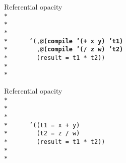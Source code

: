 \begin{frame}{Referential opacity}
  \texttt{
    \ \\*
    \ \\*
    \ \\*
    \ \\*
    \ \ \ \ \ `(,@\textbf{(compile '(+ x y) 't1)}\\*
    \ \ \ \ \ \ \ ,@\textbf{(compile '(/ z w) 't2)}\\*
    \ \ \ \ \ \ \ (result = t1 * t2)) \\*
    \ \\*
    \ 
  }
\end{frame}

\begin{frame}{Referential opacity}
  \texttt{
    \ \\*
    \ \\*
    \ \\*
    \ \\*
    \ \ \ \ \ '((t1 = x + y)\\*
    \ \ \ \ \ \ \ (t2 = z / w)\\*
    \ \ \ \ \ \ \ (result = t1 * t2)) \\*
    \ \\*
    \ 
  }
\end{frame}
